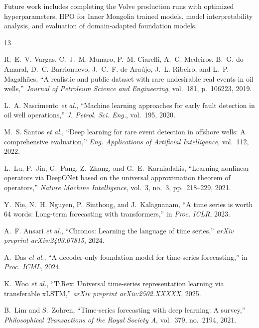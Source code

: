 \documentclass[conference]{IEEEtran}
\begin{document}
Future work includes completing the Volve production runs with optimized hyperparameters, HPO for Inner Mongolia trained models, model interpretability analysis, and evaluation of domain-adapted foundation models.


\begin{thebibliography}{13}

R.~E.~V. Vargas, C.~J.~M. Munaro, P.~M. Ciarelli, A.~G. Medeiros, B.~G. do Amaral, D.~C. Barrionuevo, J.~C.~F. de Ara{\'u}jo, J.~L. Ribeiro, and L.~P. Magalh{\~a}es,
``A realistic and public dataset with rare undesirable real events in oil wells,''
\textit{Journal of Petroleum Science and Engineering}, vol.~181, p.~106223, 2019.

L.~A. Nascimento \textit{et al.},
``Machine learning approaches for early fault detection in oil well operations,''
\textit{J. Petrol. Sci. Eng.}, vol.~195, 2020.

M.~S. Santos \textit{et al.},
``Deep learning for rare event detection in offshore wells: A comprehensive evaluation,''
\textit{Eng. Applications of Artificial Intelligence}, vol.~112, 2022.

L.~Lu, P.~Jin, G.~Pang, Z.~Zhang, and G.~E.~Karniadakis,
``Learning nonlinear operators via DeepONet based on the universal approximation theorem of operators,''
\textit{Nature Machine Intelligence}, vol.~3, no.~3, pp.~218--229, 2021.

Y.~Nie, N.~H. Nguyen, P.~Sinthong, and J.~Kalagnanam,
``A time series is worth 64 words: Long-term forecasting with transformers,''
in \textit{Proc. ICLR}, 2023.

A.~F. Ansari \textit{et al.},
``Chronos: Learning the language of time series,''
\textit{arXiv preprint arXiv:2403.07815}, 2024.

A.~Das \textit{et al.},
``A decoder-only foundation model for time-series forecasting,''
in \textit{Proc. ICML}, 2024.

K.~Woo \textit{et al.},
``TiRex: Universal time-series representation learning via transferable xLSTM,''
\textit{arXiv preprint arXiv:2502.XXXXX}, 2025.

B.~Lim and S.~Zohren,
``Time-series forecasting with deep learning: A survey,''
\textit{Philosophical Transactions of the Royal Society A}, vol.~379, no.~2194, 2021.


\end{thebibliography}
\end{document}
